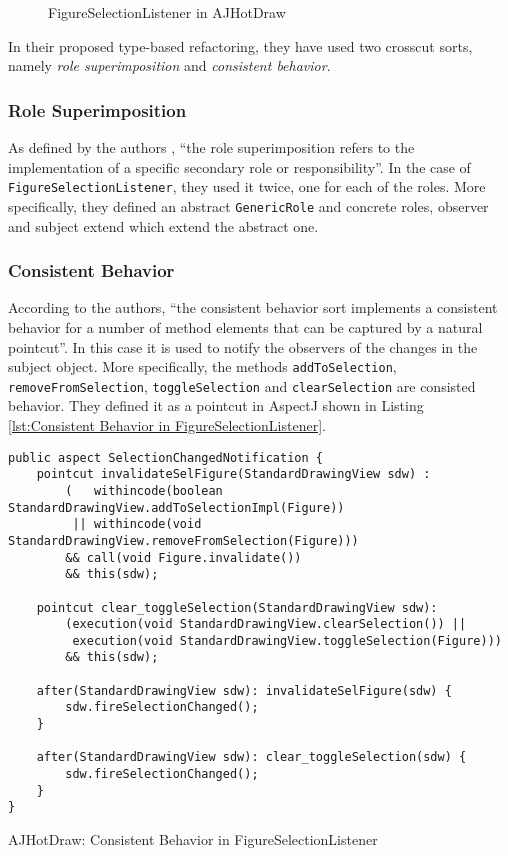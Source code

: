 \begin{figure}[H]
	\centering
  	\caption{FigureSelectionListener in AJHotDraw}
  	\label{fig:JHotDraw_FigureSelectionListener_AOP}
\end{figure}

In their proposed type-based refactoring, they have used two crosscut sorts, namely \textit{role superimposition} and \textit{consistent behavior}.

\subsubsection{Role Superimposition}
As defined by the authors \cite{marin2005classification}, ``the role superimposition refers to the implementation of a specific secondary role or responsibility''.
In the case of \texttt{FigureSelectionListener}, they used it twice, one for each of the roles.
More specifically, they defined an abstract \texttt{GenericRole} and concrete roles, observer and subject extend which extend the abstract one.

\subsubsection{Consistent Behavior}
According to the authors\cite{marin2005classification}, ``the consistent behavior sort implements a consistent behavior for a number of method elements that can be captured by a natural pointcut''.
In this case it is used to notify the observers of the changes in the subject object.
More specifically, the methods \texttt{addToSelection}, \texttt{removeFromSelection}, \texttt{toggleSelection} and \texttt{clearSelection} are consisted behavior.
They defined it as a pointcut in AspectJ shown in Listing \ref{lst:Consistent Behavior in FigureSelectionListener}.

\begin{sourcecode} [H]
	\begin{lstlisting}[language=AspectJ]
public aspect SelectionChangedNotification {
	pointcut invalidateSelFigure(StandardDrawingView sdw) :
		(   withincode(boolean StandardDrawingView.addToSelectionImpl(Figure)) 
		 || withincode(void StandardDrawingView.removeFromSelection(Figure)))
		&& call(void Figure.invalidate()) 
		&& this(sdw);

	pointcut clear_toggleSelection(StandardDrawingView sdw):
		(execution(void StandardDrawingView.clearSelection()) ||
		 execution(void StandardDrawingView.toggleSelection(Figure)))
		&& this(sdw);

	after(StandardDrawingView sdw): invalidateSelFigure(sdw) {
		sdw.fireSelectionChanged();
	}

	after(StandardDrawingView sdw): clear_toggleSelection(sdw) {
		sdw.fireSelectionChanged();
	}
}
	\end{lstlisting}
	\caption{AJHotDraw: Consistent Behavior in FigureSelectionListener}
	\label{lst:Consistent Behavior in FigureSelectionListener}
\end{sourcecode}

